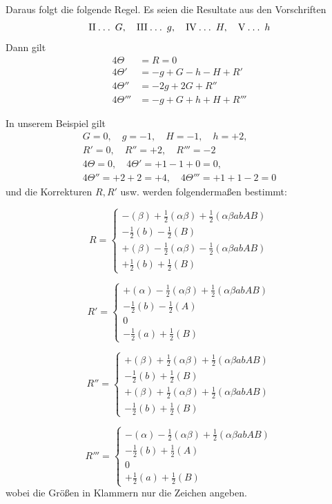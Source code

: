 Daraus folgt die folgende Regel. Es seien die Resultate aus den Vorschriften
\[
\mathrm{II}\mathbin{.}\mathbin{.}\mathbin{.}\;G,\quad
\mathrm{III}\mathbin{.}\mathbin{.}\mathbin{.}\;g,\quad
\mathrm{IV}\mathbin{.}\mathbin{.}\mathbin{.}\;H,\quad
\mathrm{V}\mathbin{.}\mathbin{.}\mathbin{.}\;h
\]
Dann gilt
\[
\begin{aligned}
4\Theta&=R=0\\
4\Theta'&=-g+G-h-H+R'\\
4\Theta''&=-2g+2G+R''\\
4\Theta'''&=-g+G+h+H+R'''
\end{aligned}
\]

In unserem Beispiel gilt
\[
\begin{gathered}
G=0,\quad g=-1,\quad H=-1,\quad h=+2,\\
R'=0,\quad R''=+2,\quad R'''=-2\\
4\Theta=0,\quad4\Theta'=+1-1+0=0,\\
4\Theta''=+2+2=+4,\quad4\Theta'''=+1+1-2=0
\end{gathered}
\]
und die Korrekturen $R,R'$ usw. werden folgendermaßen bestimmt:

\[
R=\left\{\begin{array}{l}
-(\beta)+\frac12(\alpha\beta)+\frac12(\alpha\beta abAB)\\
-\frac12(b)-\frac12(B)\\
+(\beta)-\frac12(\alpha\beta)-\frac12(\alpha\beta abAB)\\
+\frac12(b)+\frac12(B)
\end{array}\right.
\]

\[
R'=\left\{\begin{array}{l}
+(\alpha)-\frac12(\alpha\beta)+\frac12(\alpha\beta abAB)\\
-\frac12(b)-\frac12(A)\\
0\\
-\frac12(a)+\frac12(B)
\end{array}\right.
\]

\[
R''=\left\{\begin{array}{l}
+(\beta)+\frac12(\alpha\beta)+\frac12(\alpha\beta abAB)\\
-\frac12(b)+\frac12(B)\\
+(\beta)+\frac12(\alpha\beta)+\frac12(\alpha\beta abAB)\\
-\frac12(b)+\frac12(B)
\end{array}\right.
\]

\[
R'''=\left\{\begin{array}{l}
-(\alpha)-\frac12(\alpha\beta)+\frac12(\alpha\beta abAB)\\
-\frac12(b)+\frac12(A)\\
0\\
+\frac12(a)+\frac12(B)
\end{array}\right.
\]
wobei die Größen in Klammern nur die Zeichen angeben.

